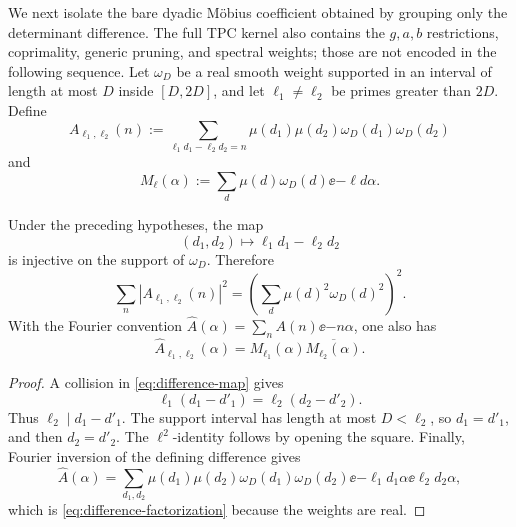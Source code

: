 We next isolate the bare dyadic M\"obius coefficient obtained by
grouping only the determinant difference.  The full TPC kernel also
contains the \(g,a,b\) restrictions, coprimality, generic pruning, and
spectral weights; those are not encoded in the following sequence.
Let \(\omega_D\) be a real smooth weight
supported in an interval of length at most \(D\) inside \([D,2D]\),
and let \(\ell_1\ne\ell_2\) be primes greater than \(2D\).  Define
\begin{equation}
 A_{\ell_1,\ell_2}(n)
 :=\sum_{\ell_1d_1-\ell_2d_2=n}
 \mu(d_1)\mu(d_2)\omega_D(d_1)\omega_D(d_2)
 \label{eq:difference-coefficient}
\end{equation}
and
\begin{equation}
 M_\ell(\alpha)
 :=\sum_d\mu(d)\omega_D(d)\ee{-\ell d\alpha}.
 \label{eq:mobius-frequency-sum}
\end{equation}

\begin{theorem}
\label{thm:difference-spectrum}
Under the preceding hypotheses, the map
\begin{equation}
 (d_1,d_2)\longmapsto \ell_1d_1-\ell_2d_2
 \label{eq:difference-map}
\end{equation}
is injective on the support of \(\omega_D\).  Therefore
\begin{equation}
 \sum_n|A_{\ell_1,\ell_2}(n)|^2
 =\left(\sum_d\mu(d)^2\omega_D(d)^2\right)^2.
 \label{eq:difference-l2}
\end{equation}
With the Fourier convention
\(\widehat A(\alpha)=\sum_nA(n)\ee{-n\alpha}\), one also has
\begin{equation}
 \boxed{\quad
 \widehat A_{\ell_1,\ell_2}(\alpha)
 =M_{\ell_1}(\alpha)\overline{M_{\ell_2}(\alpha)}.
 \quad}
 \label{eq:difference-factorization}
\end{equation}
\end{theorem}

\begin{proof}
A collision in \eqref{eq:difference-map} gives
\[
 \ell_1(d_1-d'_1)=\ell_2(d_2-d'_2).
\]
Thus \(\ell_2\mid d_1-d'_1\).  The support interval has length at
most \(D<\ell_2\), so \(d_1=d'_1\), and then \(d_2=d'_2\).
The \(\ell^2\)-identity follows by opening the square.  Finally,
Fourier inversion of the defining difference gives
\[
 \widehat A(\alpha)
 =\sum_{d_1,d_2}\mu(d_1)\mu(d_2)
 \omega_D(d_1)\omega_D(d_2)
 \ee{-\ell_1d_1\alpha}\ee{\ell_2d_2\alpha},
\]
which is \eqref{eq:difference-factorization} because the weights are
real.
\end{proof}

